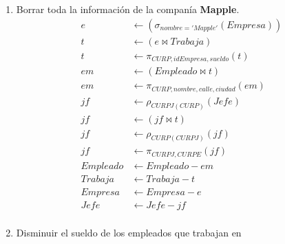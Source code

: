 \documentclass{article}
\begin{document}
\begin{enumerate}
{{\begin{enumerate}
{                        Lista con el \textbf{nombre de las companías} que están
                        instaladas en una ciudad donde haya un
                        \textbf{Krusty Burger}.
                        \begin{align*}
                            r &\leftarrow \pi_{ciudad}(\sigma_{nombre = 'Krusty Burger'}(Empresa)) \\
                            r &\leftarrow (Empresa \bowtie r) \\
                            r &\leftarrow \pi_{nombre}(r) \\
                        \end{align*}
                    }
                    \item {
                        Borrar toda la información de la companía
                        \textbf{Mapple}.
                        \begin{align*}
                            e &\leftarrow (\sigma_{nombre = 'Mapple'}(Empresa)) \\
                            t &\leftarrow (e \bowtie Trabaja) \\
                            t &\leftarrow \pi_{CURP,idEmpresa,sueldo}(t)\\
                            em &\leftarrow (Empleado \bowtie t) \\
                            em &\leftarrow \pi_{CURP,nombre,calle,ciudad}(em)\\
                            jf &\leftarrow \rho_{CURPJ(CURP)}(Jefe) \\
                            jf &\leftarrow (jf \bowtie t) \\
                            jf &\leftarrow \rho_{CURP(CURPJ)}(jf) \\
                            jf &\leftarrow \pi_{CURPJ,CURPE}(jf)\\
                            Empleado &\leftarrow Empleado - em\\
                            Trabaja &\leftarrow Trabaja - t\\
                            Empresa &\leftarrow Empresa - e\\
                            Jefe &\leftarrow Jefe - jf\\
                        \end{align*}
                    }
                    \item {
                        Disminuir el sueldo de los empleados que trabajan en
}
\end{enumerate}}}
\end{enumerate}
\end{document}
